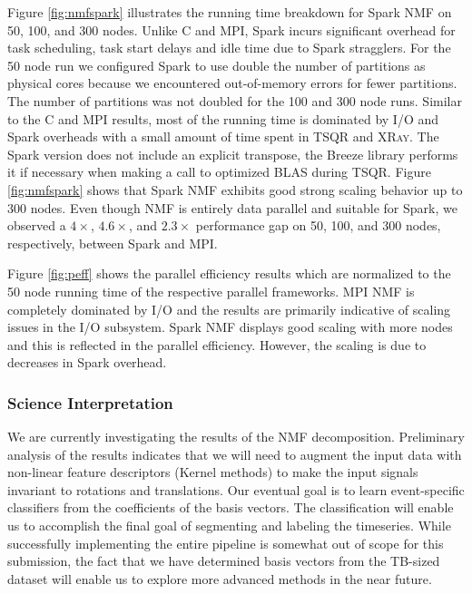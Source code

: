 Figure \ref{fig:nmfspark} illustrates the running time breakdown for Spark NMF on 50, 100, and 300 nodes. Unlike C and MPI, Spark incurs significant overhead for task scheduling, task start delays and idle time due to Spark stragglers. For the 50 node run we configured Spark to use double the number of partitions as physical cores because we encountered out-of-memory errors for fewer partitions. The number of partitions was not doubled for the 100 and 300 node runs. Similar to the C and MPI results, most of the running time is dominated by I/O and Spark overheads with a small amount of time spent in TSQR and \textsc{XRay}. The Spark version does not include an explicit transpose, the Breeze library performs it if necessary when making a call to optimized BLAS during TSQR. Figure \ref{fig:nmfspark} shows that Spark NMF exhibits good strong scaling behavior up to 300 nodes.  Even though NMF is entirely data parallel and suitable for Spark, we observed a $4\times$, $4.6\times$, and $2.3\times$ performance gap on 50, 100, and 300 nodes, respectively, between Spark and MPI.

Figure \ref{fig:peff} shows the parallel efficiency results which are normalized to the 50 node running time of the respective parallel frameworks. MPI NMF is completely dominated by I/O and the results are primarily indicative of scaling issues in the I/O subsystem. Spark NMF displays good scaling with more nodes and this is reflected in the parallel efficiency. However, the scaling is due to decreases in Spark overhead.

\subsubsection{Science Interpretation}
We are currently investigating the results of the NMF decomposition. Preliminary analysis of the results indicates that we will need to augment the input data with non-linear feature descriptors (Kernel methods) to make the input signals invariant to rotations and translations. Our eventual goal is to learn event-specific classifiers from the coefficients of the basis vectors. The classification will enable us to accomplish the final goal of segmenting and labeling the timeseries. While successfully implementing the entire pipeline is somewhat out of scope for this submission, the fact that we have determined basis vectors from the TB-sized dataset will enable us to explore more advanced methods in the near future.

